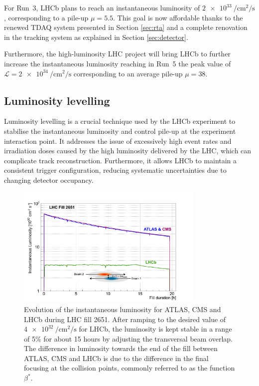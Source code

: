 For Run~3, LHCb plans to reach an instantaneous luminosity of $\SI{2e33}{\per\centi\meter\squared\per\second}$, corresponding to a pile-up $\mu=5.5$.
This goal is now affordable thanks to the renewed TDAQ system presented in Section \ref{sec:rta} and a complete renovation in the tracking system as explained in Section \ref{sec:detector}. 

Furthermore, the high-luminosity LHC project will bring LHCb to further increase the instantaneous luminosity reaching in Run~5 the peak value of $\mathcal{L}=\SI{2e34}{\per\centi\meter\squared\per\second}$ corresponding to an average pile-up $\mu=38$.

\subsection{Luminosity levelling}\label{sec:lumi_levelling}

Luminosity levelling is a crucial technique used by the LHCb experiment to stabilise the instantaneous luminosity and control pile-up at the experiment interaction point. It addresses the issue of excessively high event rates and irradiation doses caused by the high luminosity delivered by the LHC, which can complicate track reconstruction. Furthermore, it allows LHCb to maintain a consistent trigger configuration, reducing systematic uncertainties due to changing detector occupancy.

\begin{figure}
    \centering
    \includegraphics[width=0.8\textwidth]{figures/luminosity_leveling.png}
    \caption{Evolution of the instantaneous luminosity for ATLAS, CMS and LHCb during LHC fill 2651. After ramping to the desired value of $\SI{4e32}{\per\centi\meter\squared\per\second}$ for LHCb, the luminosity is kept stable in a range of 5\% for about 15 hours by adjusting the transversal beam overlap.
    The difference in luminosity towards the end of the fill between ATLAS, CMS and LHCb is due to the difference in the final focusing at the collision points, commonly referred to as the function $\beta^*$.}
    \label{fig:lumi-leveling}
\end{figure}

